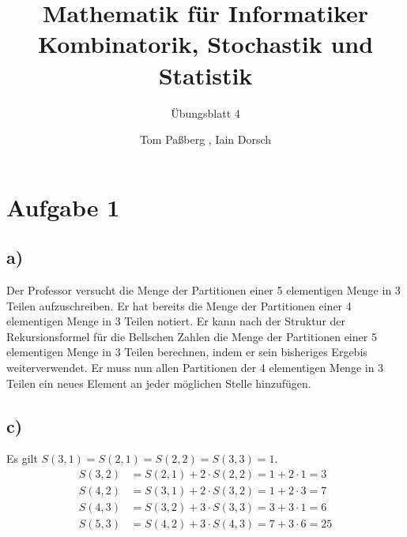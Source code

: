 \documentclass[a4paper]{scrartcl}
\title{Mathematik für Informatiker \\ Kombinatorik, Stochastik und Statistik}
\subtitle{Übungsblatt 4}
\author{Tom Paßberg , Iain Dorsch}
\date{}
\begin{document}
\maketitle

\newpage

\section*{Aufgabe 1}
\subsection*{a)}
Der Professor versucht die Menge der Partitionen einer 5 elementigen Menge in 3 Teilen aufzuschreiben.
Er hat bereits die Menge der Partitionen einer 4 elementigen Menge in 3 Teilen notiert.
Er kann nach der Struktur der Rekursionsformel für die Bellschen Zahlen die Menge der Partitionen einer 5 elementigen Menge in 3 Teilen berechnen,
indem er sein bisheriges Ergebis weiterverwendet.
Er muss nun allen Partitionen der 4 elementigen Menge in 3 Teilen ein neues Element an jeder möglichen Stelle hinzufügen.

\subsection*{c)}
Es gilt $ S(3,1) = S(2,1) = S(2,2) = S(3,3) = 1$.
\begin{align*}
    S(3,2) &= S(2,1) + 2 \cdot S(2,2) = 1 + 2 \cdot 1 = 3 \\
    S(4,2) &= S(3,1) + 2 \cdot S(3,2) = 1 + 2 \cdot 3 = 7 \\
    S(4,3) &= S(3,2) + 3 \cdot S(3,3) = 3 + 3 \cdot 1 = 6 \\
    S(5,3) &= S(4,2) + 3 \cdot S(4,3) = 7 + 3 \cdot 6 = 25 \\
\end{align*}
\end{document}
